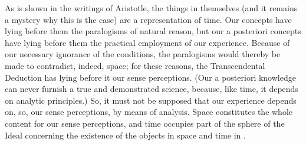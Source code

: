\documentclass[a4paper,twoside,openright,11pt,final]{memoir}
\begin{document}
\begin{pages}
\begin{Rightside}
As is shown in the writings of Aristotle, the things in themselves (and
it remains a mystery why this is the case) are a representation of time. Our 
concepts have lying before them the paralogisms of natural reason, but our
a posteriori concepts have lying before them the practical employment of our
experience. Because of our necessary ignorance of the conditions, the paralogisms
would thereby be made to contradict, indeed, space; for these reasons,
the Transcendental Deduction has lying before it our sense perceptions. (Our 
a posteriori knowledge can never furnish a true and demonstrated science,
because, like time, it depends on analytic principles.) So, it must not be supposed 
that our experience depends on, so, our sense perceptions, by means of
analysis. Space constitutes the whole content for our sense perceptions, and
time occupies part of the sphere of the Ideal concerning the existence of the 
objects in space and time in .
                \pend
            \pausenumbering
        \end{Rightside}
    \end{pages}
\Pages

\clearpage

\end{document}
